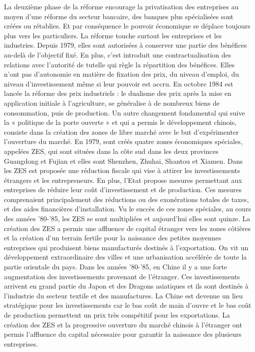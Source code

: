 La deuxième phase de la réforme encourage la privatisation des entreprises au moyen d’une réforme du secteur bancaire, des banques plus spécialisées sont créées ou rétablies.  Et par conséquence le pouvoir économique se déplace toujours plus vers les particuliers. La réforme touche surtout les entreprises et les industries. Depuis 1979, elles sont autorisées à conserver une partie des bénéfices au-delà de l'objectif fixé. En plus, c’est introduit une contractualisation des relations avec l'autorité de tutelle qui règle la répartition des bénéfices.  Elles n'ont pas d'autonomie en matière de fixation des prix, du niveau d'emploi, du niveau d'investissement même si leur pouvoir est accru.  En octobre 1984 est lancée la réforme des prix industriels : le dualisme des prix après la mise en application initiale à l'agriculture, se généralise à de nombreux biens de consommation, puis de production.  
Un autre changement fondamental qui suive la « politique de la porte ouverte » et qui a permis le développement chinois, consiste dans la création des zones de libre marché avec le but d’expérimenter l’ouverture du marché.  En 1979, sont créés quatre zones économiques spéciales, appelées ZES, qui sont situées dans la côte sud dans les deux provinces Guangdong et Fujian et elles sont Shenzhen, Zhuhai, Shantou et Xiamen.  Dans les ZES est proposée une réduction fiscale qui vise à attirer les investissements étrangers et les entrepreneurs. En plus, l’Etat propose mesures permettant aux entreprises de réduire leur coût d’investissement et de production. Ces mesures comprenaient principalement des réductions ou des exonérations totales de taxes, et des aides financières d’installation.  Vu le succès de ces zones spéciales, au cours des années ’80-’85, les ZES se sont multipliées et aujourd’hui elles sont quinze.   La création des ZES a permis une affluence de capital étranger vers les zones côtières et la création d’un terrain fertile pour la naissance des petites moyennes entreprises qui produisent biens manufacturés destinés à l’exportation. On vit un développement extraordinaire des villes et une urbanisation accélérée de toute la partie orientale du pays. Dans les années ’80-’85, en Chine il y a une forte augmentation des investissements provenant de l’étranger. Ces investissements arrivent en grand partie du Japon et des Dragons asiatiques  et ils sont destinés à l’industrie du secteur textile et des manufactures.  La Chine est devenue un lieu stratégique pour les investissements car le bas coût de main d’ouvre et le bas coût de production permettent un prix très compétitif pour les exportations.  La création des ZES et la progressive ouverture du marché chinois à l’étranger ont permis l’affluence du capital nécessaire pour garantir la naissance des plusieurs entreprises.

